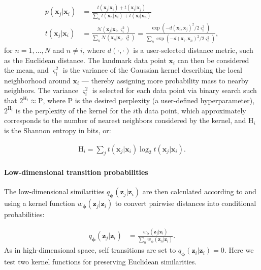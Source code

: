 \documentclass[11pt,a4paper,twoside]{book}
\begin{document}
\begin{doublespace}
\begin{appendices}
\begin{subequations}
    \begin{align}
    p(\mathbf{x}_j | \mathbf{x}_i) &= \frac{t(\mathbf{x}_j | \mathbf{x}_i) + t(\mathbf{x}_i | \mathbf{x}_j)}{\sum_{n} t(\mathbf{x}_n | \mathbf{x}_i) + t(\mathbf{x}_i | \mathbf{x}_n)} \label{eq:highd_sim}\\
    t(\mathbf{x}_j | \mathbf{x}_i) &= \frac{\mathcal{N}(\mathbf{x}_j | \mathbf{x}_i, \varsigma_i^{2})}{\sum_{n} \mathcal{N}(\mathbf{x}_n | \mathbf{x}_i, \varsigma_i^{2})} = \frac{\exp \left(-d(\mathbf{x}_i, \mathbf{x}_j)^2 / 2 \varsigma_i^{2}\right)}{\sum_{n} \exp \left(-d(\mathbf{x}_i, \mathbf{x}_n)^2 / 2 \varsigma_i^{2}\right)} \label{eq:transition},
    \end{align}
\end{subequations}
for $n = 1, \dots ,N$ and $n \neq i$, where $d(\cdot, \cdot)$ is a user-selected distance metric, such as the Euclidean distance. The landmark data point $\mathbf{x}_i$ can then be considered the mean, and $\varsigma_i^{2}$ is the variance of the Gaussian kernel describing the local neighborhood around $\mathbf{x}_i$ --- thereby assigning more probability mass to nearby neighbors. 
The variance $\varsigma_i^{2}$ is selected for each data point via binary search such that $2^{\mathrm{H}_i} \approx \mathrm{P}$, where $\mathrm{P}$ is the desired perplexity (a user-defined hyperparameter), $2^{\mathrm{H}_i}$ is the perplexity of the kernel for the $i$th data point, which approximately corresponds to the number of nearest neighbors considered by the kernel, and $\mathrm{H}_i$ is the Shannon entropy in bits, or:

\begin{align}
\mathrm{H}_i = \sum_{j} t(\mathbf{x}_j | \mathbf{x}_i) \log_2 t(\mathbf{x}_j | \mathbf{x}_i).
\end{align}
\paragraph{Low-dimensional transition probabilities} The low-dimensional similarities $q_{\boldsymbol{\phi}}(\mathbf{z}_j | \mathbf{z}_i)$ are then calculated according to \cite{hinton2003stochastic} and \cite{maaten2008tsne} using a kernel function $w_{\boldsymbol{\phi}}(\mathbf{z}_j | \mathbf{z}_i)$ to convert pairwise distances into conditional probabilities:

\begin{align}
    q_{\boldsymbol{\phi}}(\mathbf{z}_j | \mathbf{z}_i) &=  \frac{w_{\boldsymbol{\phi}}(\mathbf{z}_j | \mathbf{z}_i)}{\sum_{n} w_{\boldsymbol{\phi}}(\mathbf{z}_n | \mathbf{z}_i)}\label{eq:lowd_sim}.
\end{align}
As in high-dimensional space, self transitions are set to $q_{\boldsymbol{\phi}}(\mathbf{z}_i|\mathbf{z}_i) = 0$. Here we test two kernel functions for preserving Euclidean similarities. 

\end{appendices}
\end{doublespace}
\end{document}
